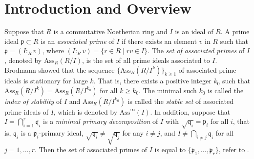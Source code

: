 \documentclass[11pt]{amsart}
\begin{document}
\vspace{0.4cm}



 
\section{Introduction and Overview}

Suppose  that $R$ is  a commutative  Noetherian ring and $I$ is an ideal of $R$. A prime ideal $\mathfrak{p}\subset  R$ is an {\it associated prime} of $I$ if there exists an element $v$ in $R$ such that $\mathfrak{p}=(I:_R v)$, where $(I:_R v)=\{r\in R \mid  rv\in I\}$. The  {\it set of associated primes} of $I$, denoted by  $\mathrm{Ass}_R(R/I)$, is the set of all prime ideals associated to  $I$.  Brodmann \cite{BR} showed that the sequence $\{\mathrm{Ass}_R(R/I^k)\}_{k \geq 1}$ of associated prime ideals is stationary  for large $k$. That is, there exists a positive integer $k_0$ such that $\mathrm{Ass}_R(R/I^k)=\mathrm{Ass}_R(R/I^{k_0})$ for all $k\geq k_0$. The  minimal such $k_0$ is called the {\it index of stability}   of  $I$ and $\mathrm{Ass}_R(R/I^{k_0})$ is called the {\it stable set }  of associated prime ideals of  $I$, which is denoted by $\mathrm{Ass}^{\infty }(I).$ In addition, suppose that  $I=\bigcap_{i=1}^r\mathfrak{q}_i$ is   a \textit{minimal primary decomposition} of $I$ with $\sqrt{\mathfrak{q}_i}=\mathfrak{p}_i$ for all $i$,  that is, $\mathfrak{q}_i$ is a $\mathfrak{p}_i$-primary ideal, 
  $\sqrt{\mathfrak{q}_i}\neq \sqrt{\mathfrak{q}_j}$ for any $i\neq j$, and $I\neq \bigcap_{i\neq j}\mathfrak{q}_i$ for all $j =1, \ldots, r$. Then the  set of  associated primes of  $I$ is equal to $\{\mathfrak{p}_1, \ldots, \mathfrak{p}_r\}$, refer to  \cite[Theorem 4.5]{Atiyah}. 
 
\end{document}
